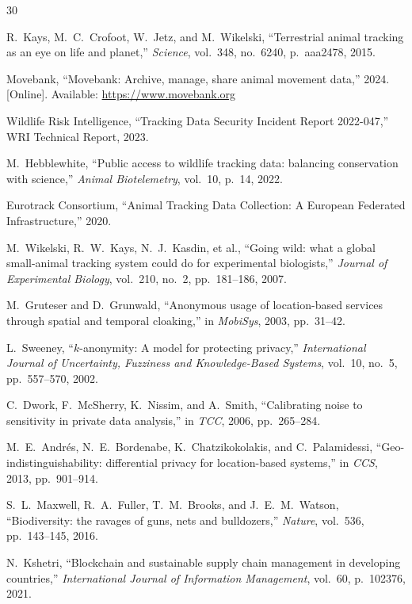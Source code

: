 \documentclass[11pt,letterpaper]{article}
\begin{document}
\begin{thebibliography}{30}

R.~Kays, M.~C.~Crofoot, W.~Jetz, and M.~Wikelski, ``Terrestrial animal tracking as an eye on life and planet,'' \emph{Science}, vol.~348, no.~6240, p.~aaa2478, 2015.

Movebank, ``Movebank: Archive, manage, share animal movement data,'' 2024. [Online]. Available: \url{https://www.movebank.org}

Wildlife Risk Intelligence, ``Tracking Data Security Incident Report 2022-047,'' WRI Technical Report, 2023.

M.~Hebblewhite, ``Public access to wildlife tracking data: balancing conservation with science,'' \emph{Animal Biotelemetry}, vol.~10, p.~14, 2022.

Eurotrack Consortium, ``Animal Tracking Data Collection: A European Federated Infrastructure,'' 2020.

M.~Wikelski, R.~W.~Kays, N.~J.~Kasdin, et al., ``Going wild: what a global small-animal tracking system could do for experimental biologists,'' \emph{Journal of Experimental Biology}, vol.~210, no.~2, pp.~181--186, 2007.

M.~Gruteser and D.~Grunwald, ``Anonymous usage of location-based services through spatial and temporal cloaking,'' in \emph{MobiSys}, 2003, pp.~31--42.

L.~Sweeney, ``$k$-anonymity: A model for protecting privacy,'' \emph{International Journal of Uncertainty, Fuzziness and Knowledge-Based Systems}, vol.~10, no.~5, pp.~557--570, 2002.

C.~Dwork, F.~McSherry, K.~Nissim, and A.~Smith, ``Calibrating noise to sensitivity in private data analysis,'' in \emph{TCC}, 2006, pp.~265--284.

M.~E.~Andr{\'e}s, N.~E.~Bordenabe, K.~Chatzikokolakis, and C.~Palamidessi, ``Geo-indistinguishability: differential privacy for location-based systems,'' in \emph{CCS}, 2013, pp.~901--914.

S.~L.~Maxwell, R.~A.~Fuller, T.~M.~Brooks, and J.~E.~M.~Watson, ``Biodiversity: the ravages of guns, nets and bulldozers,'' \emph{Nature}, vol.~536, pp.~143--145, 2016.

N.~Kshetri, ``Blockchain and sustainable supply chain management in developing countries,'' \emph{International Journal of Information Management}, vol.~60, p.~102376, 2021.


\end{thebibliography}
\end{document}
